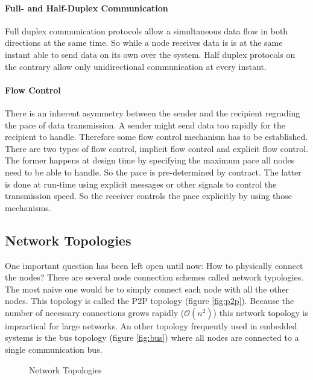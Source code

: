 \documentclass[pdftex,12pt,a4paper,fleqn]{scrartcl}
\begin{document}
\paragraph{Full- and Half-Duplex Communication} Full duplex communication protocols allow a simultaneous data flow in both directions at the same time. So while a node receives data is is at the same instant able to send data on its own over the system. Half duplex protocols on the contrary allow only unidirectional communication at every instant.

\paragraph{Flow Control} There is an inherent asymmetry between the sender and the recipient regrading the pace of data transmission. A sender might send data too rapidly for the recipient to handle. Therefore some flow control mechanism has to be established. There are two types of flow control, implicit flow control and explicit flow control. The former happens at design time by specifying the maximum pace all nodes need to be able to handle. So the pace is pre-determined by contract. The latter is done at run-time using explicit messages or other signals to control the transmission speed. So the receiver controls the pace explicitly by using those mechanisms.

\subsection{Network Topologies}
One important question has been left open until now: How to physically connect the nodes? There are several node connection schemes called network typologies. The most naive one would be to simply connect each node with all the other nodes. This topology is called the P2P topology (figure \ref{fig:p2p}). Because the number of necessary connections grows rapidly ($\mathcal{O}(n^2)$) this network topology is impractical for large networks. An other topology frequently used in embedded systems is the bus topology (figure \ref{fig:bus}) where all nodes are connected to a single communication bus.

\begin{figure}[H]
  \hspace{.8cm}
  \caption{Network Topologies}
\end{figure}
\end{document}
